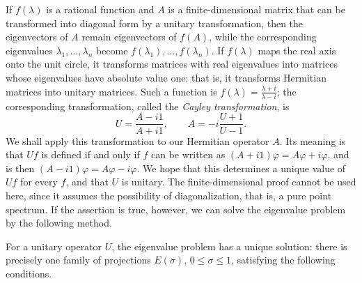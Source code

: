 \documentclass[fontsize=13pt,twoside,openany,headings=normal,parskip=false,bookmarkpackage=false,DIV=calc]{scrbook}
\begin{document}
If $f(\lambda)$ is a rational function and $A$ is a finite-dimensional matrix that can be transformed into diagonal form by a unitary transformation, then the eigenvectors of $A$ remain eigenvectors of $f(A)$, while the corresponding eigenvalues $\lambda_1,\ldots,\lambda_n$ become $f(\lambda_1),\ldots,f(\lambda_n)$. If $f(\lambda)$ maps the real axis onto the unit circle, it transforms matrices with real eigenvalues into matrices whose eigenvalues have absolute value one: that is, it transforms Hermitian matrices into unitary matrices. Such a function is $f(\lambda)=\frac{\lambda+i}{\lambda-i}$; the corresponding transformation, called the \emph{Cayley transformation}, is
\[
U=\frac{A-i1}{A+i1},\qquad A=-i\frac{U+1}{U-1}.
\]
We shall apply this transformation to our Hermitian operator $A$. Its meaning is that $Uf$ is defined if and only if $f$ can be written as $(A+i1)\varphi=A\varphi+i\varphi$, and is then $(A-i1)\varphi=A\varphi-i\varphi$. We hope that this determines a unique value of $Uf$ for every $f$, and that $U$ is unitary. The finite-dimensional proof cannot be used here, since it assumes the possibility of diagonalization, that is, a pure point spectrum. If the assertion is true, however, we can solve the eigenvalue problem by the following method.

For a unitary operator $U$, the eigenvalue problem has a unique solution: there is precisely one family of projections $E(\sigma)$, $0\leq\sigma\leq1$, satisfying the following conditions.
\end{document}
